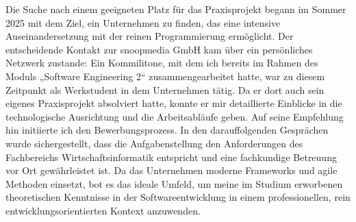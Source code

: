 Die Suche nach einem geeigneten Platz für das Praxisprojekt begann im Sommer 2025 mit dem Ziel, ein Unternehmen zu finden, das eine intensive Auseinandersetzung mit der reinen 
Programmierung ermöglicht. Der entscheidende Kontakt zur snoopmedia GmbH kam über ein persönliches Netzwerk zustande: Ein Kommilitone, mit dem ich bereits im Rahmen des Moduls 
„Software Engineering 2“ zusammengearbeitet hatte, war zu diesem Zeitpunkt als Werkstudent in dem Unternehmen tätig. Da er dort auch sein eigenes Praxisprojekt absolviert hatte, 
konnte er mir detaillierte Einblicke in die technologische Ausrichtung und die Arbeitsabläufe geben. Auf seine Empfehlung hin initiierte ich den Bewerbungsprozess. 
In den darauffolgenden Gesprächen wurde sichergestellt, dass die Aufgabenstellung den Anforderungen des Fachbereichs Wirtschaftsinformatik entspricht und eine fachkundige Betreuung 
vor Ort gewährleistet ist. Da das Unternehmen moderne Frameworks und agile Methoden einsetzt, bot es das ideale Umfeld, um meine im Studium erworbenen theoretischen Kenntnisse in 
der Softwareentwicklung in einem professionellen, rein entwicklungsorientierten Kontext anzuwenden.